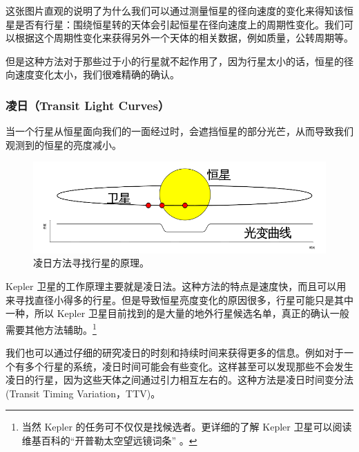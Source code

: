 \documentclass[letterpaper,10pt,english]{sphinxmanual}
\begin{document}
这张图片直观的说明了为什么我们可以通过测量恒星的径向速度的变化来得知该恒星是否有行星：围绕恒星转的天体会引起恒星在径向速度上的周期性变化。我们可以根据这个周期性变化来获得另外一个天体的相关数据，例如质量，公转周期等。

但是这种方法对于那些过于小的行星就不起作用了，因为行星太小的话，恒星的径向速度变化太小，我们很难精确的确认。


\subsubsection{凌日（Transit Light Curves）}
\label{intro:transit-light-curves}
当一个行星从恒星面向我们的一面经过时，会遮挡恒星的部分光芒，从而导致我们观测到的恒星的亮度减小。
\begin{figure}[htbp]
\centering
\capstart

\includegraphics{800px-Planetary_transit_zh.svg_.png}
\caption{凌日方法寻找行星的原理。}\end{figure}

Kepler 卫星的工作原理主要就是凌日法。这种方法的特点是速度快，而且可以用来寻找直径小得多的行星。但是导致恒星亮度变化的原因很多，行星可能只是其中一种，所以 Kepler 卫星目前找到的是大量的地外行星候选名单，真正的确认一般需要其他方法辅助。\footnote{
当然 Kepler 的任务可不仅仅是找候选者。更详细的了解 Kepler 卫星可以阅读维基百科的“开普勒太空望远镜词条” 。
}

我们也可以通过仔细的研究凌日的时刻和持续时间来获得更多的信息。例如对于一个有多个行星的系统，凌日时间可能会有些变化。这样甚至可以发现那些不会发生凌日的行星，因为这些天体之间通过引力相互左右的。这种方法是凌日时间变分法(Transit Timing Variation，TTV)。
\end{document}
